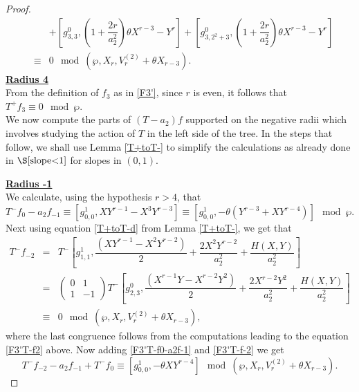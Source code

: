 \documentclass[11pt, reqno]{amsart}
\numberwithin{equation}{section}
\theoremstyle{definition}
\theoremstyle{remark}
\theoremstyle{definition}
\theoremstyle{remark}
\theoremstyle{remark}
\begin{document}
\begin{proof}
\begin{eqnarray*}
   && + \left[g_{3,3}^{0},\left(1+\dfrac{2r}{a_{2}^2}\right)\theta X^{r-3}-Y^{r}\right]
    + \left[g_{3,2^2+3}^{0},\left(1+\dfrac{2r}{a_{2}^2}\right)\theta X^{r-3}-Y^{r} \right] \nonumber\\
    &\equiv & 0\mod(\wp,X_{r},V_{r}^{(2)}+\theta X_{r-3}).
    \end{eqnarray*}
\noindent\underline{\textbf{Radius 4}}\\
From the definition of $f_{3}$ as in \eqref{F3'}, since $r$ is even, it follows that $T^{+}f_{3} \equiv 0 \mod \wp$.\\

We now compute  the parts of $(T-a_{2})f$ supported on the negative radii which involves studying the action of $T$ in the left side of the tree. In the steps that follow, we shall use Lemma \ref{T+toT-} to simplify the calculations as already done in $\S \ref{slope<1}$ for slopes in $(0,1)$.

\noindent\underline{\textbf{Radius -1}}\\   
We calculate, using the hypothesis $r>4$, that
\begin{equation}\label{F3'T-f0-a2f-1}
    T^{-}f_{0} -a_{2}f_{-1} \equiv \left[g_{0,0}^{1}, XY^{r-1}-X^{3}Y^{r-3}\right] \equiv \left[g_{0,0}^{1}, -\theta(Y^{r-3}+XY^{r-4})\right]\mod \wp.
\end{equation}
 Next using equation \eqref{T+toT-d} from Lemma \eqref{T+toT-}, we get that
 \begin{eqnarray}
T^{-}f_{-2} &=& T^{-}\left[g_{1,1}^{1}, \dfrac{(XY^{r-1}-X^2Y^{r-2})}{2}+\dfrac{2X^{2}Y^{r-2}}{a_{2}^2} + \dfrac{H(X,Y)}{a_{2}^2} \right] \nonumber\\
&=& \begin{pmatrix}
    0 & 1\\
    1 & -1
\end{pmatrix}T^{-}\left[g_{2,3}^{0},\dfrac{(X^{r-1}Y-X^{r-2}Y^2)}{2}+\dfrac{2X^{r-2}Y^{2}}{a_{2}^2} + \dfrac{H(X,Y)}{a_{2}^2}\right] \nonumber\\
&\equiv & 0\mod(\wp, X_{r}, V_{r}^{(2)}+\theta X_{r-3})\label{F3'T-f-2},
\end{eqnarray}
where the last congruence follows from the computations leading to the equation \eqref{F3'T-f2} above. Now adding \eqref{F3'T-f0-a2f-1} and \eqref{F3'T-f-2} we get
\begin{equation}\label{sl1F3'rad-1}
T^-f_{-2}-a_{2}f_{-1}+T^{-}f_{0} \equiv \left[g_{0,0}^{1}, -\theta XY^{r-4}    \right]\mod(\wp, X_{r},V_{r}^{(2)}+\theta X_{r-3}).
\end{equation} 


\end{proof}
\end{document}
